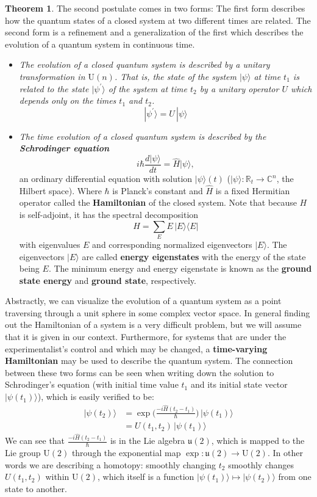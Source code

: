 \documentclass{article}
\theoremstyle{definition}
\newtheorem{theorem}{Theorem}[section]
\begin{document}
\begin{theorem}
The second postulate comes in two forms: The first form describes how the quantum states of a closed system at two different times are related. The second form is a refinement and a generalization of the first which describes the evolution of a quantum system in continuous time.
\begin{itemize}
    \item \textit{The evolution of a closed quantum system is described by a unitary transformation in $\text{U}(n)$. That is, the state of the system $|\psi \rangle$ at time $t_1$ is related to the state $|\psi^\prime \rangle$ of the system at time $t_2$ by a unitary operator $U$ which depends only on the times $t_1$ and $t_2$.}
      \[|\psi^\prime \rangle = U \, |\psi \rangle\]
    \item \textit{The time evolution of a closed quantum system is described by the \textbf{Schrodinger equation}}
        \[i \hbar \frac{d |\psi \rangle}{dt} = \hat{H} |\psi \rangle, \]
      an ordinary differential equation with solution $| \psi \rangle (t)$ ($|\psi\rangle: \mathbb{R}_t \longrightarrow \mathbb{C}^n$, the Hilbert space). Where $\hbar$ is Planck's constant and $\hat{H}$ is a fixed Hermitian operator called the \textbf{Hamiltonian} of the closed system. Note that because $H$ is self-adjoint, it has the spectral decomposition
        \[H = \sum_{E} E \, |E \rangle \langle E |\]
      with eigenvalues $E$ and corresponding normalized eigenvectors $|E \rangle$. The eigenvectors $|E \rangle$ are called \textbf{energy eigenstates} with the energy of the state being $E$. The minimum energy and energy eigenstate is known as the \textbf{ground state energy} and \textbf{ground state}, respectively.
\end{itemize}
Abstractly, we can visualize the evolution of a quantum system as a point traversing through a unit sphere in some complex vector space.
In general finding out the Hamiltonian of a system is a very difficult problem, but we will assume that it is given in our context. Furthermore, for systems that are under the experimentalist's control and which may be changed, a \textbf{time-varying Hamiltonian} may be used to describe the quantum system.
The connection between these two forms can be seen when writing down the solution to Schrodinger's equation (with initial time value $t_1$ and its initial state vector $|\psi (t_1)\rangle$), which is easily verified to be:
\begin{align*}
  |\psi (t_2) \rangle & = \exp \bigg( \frac{-i \hat{H} (t_2 - t_1)}{\hbar} \bigg) \, |\psi(t_1)\rangle \\
  & = U(t_1, t_2) \, |\psi (t_1) \rangle
\end{align*}
We can see that $\frac{-i \hat{H} (t_2 - t_1)}{\hbar}$ is in the Lie algebra $\mathfrak{u}(2)$, which is mapped to the Lie group $\text{U}(2)$ through the exponential map $\exp: \mathfrak{u}(2) \longrightarrow \text{U}(2)$. In other words we are describing a homotopy: smoothly changing $t_2$ smoothly changes $U(t_1, t_2)$ within $\text{U}(2)$, which itself is a function $|\psi (t_1) \rangle \mapsto | \psi (t_2) \rangle$ from one state to another.
\end{theorem}
\end{document}

